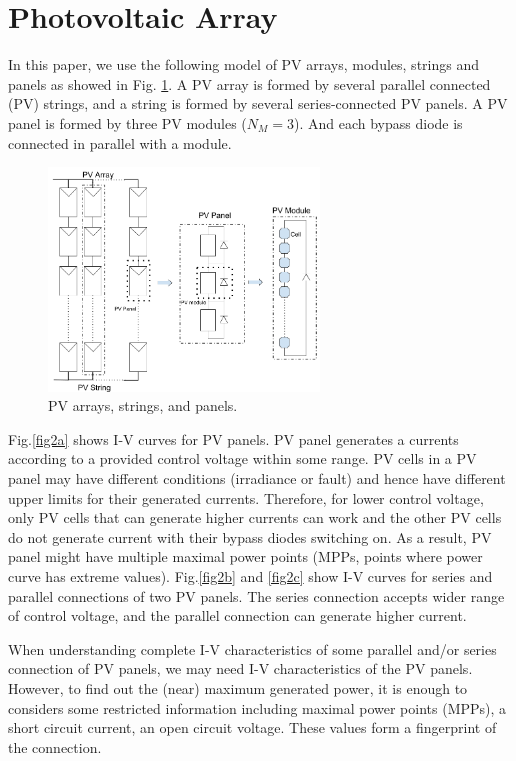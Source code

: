 \documentclass[conference]{IEEEtran}
\begin{document}
\section{Photovoltaic Array} \label{array}
In this paper, we use the following model of PV arrays, modules, strings and panels as showed in Fig. \ref{fig1}. A PV array is formed by several parallel connected (PV) strings, and a string is formed by several series-connected PV panels. A PV panel is formed by three PV modules (\textit{$N_M=3$}).
And each bypass diode is connected in parallel with a module.
\begin{figure}[htbp]
\centerline{\includegraphics[width=7.2cm]{paper-fig1.png}}
\caption{PV arrays, strings, and panels.}
\label{fig1}
\end{figure}

Fig.\ref{fig2a} shows  I-V curves for PV panels. PV panel generates a currents according to a provided control voltage within some range.
PV cells in a PV panel may have different conditions (irradiance or fault) and hence have different upper limits for their generated currents. Therefore, for lower control voltage, only PV cells that can generate higher currents can work and the other PV cells do not generate current with their bypass diodes switching on. As a result, PV panel might have multiple maximal power points (MPPs, points where power curve has extreme values). 
Fig.\ref{fig2b} and \ref{fig2c} show I-V curves for series and parallel connections of two PV panels. The series connection accepts wider range of control voltage, and the parallel connection can generate higher current. 

When understanding complete I-V characteristics of some parallel and/or series connection of PV panels, we may need I-V characteristics of the PV panels. However, to find out the (near)  maximum generated power, it is enough to considers some restricted information including maximal power points (MPPs), a short circuit current, an open circuit voltage. These values form a fingerprint of the connection.
\end{document}
